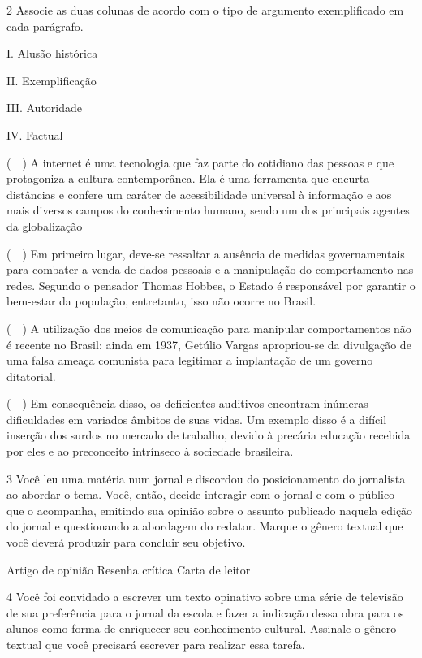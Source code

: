 \num{2} Associe as duas colunas de acordo com o tipo de argumento
exemplificado em cada parágrafo.

\begin{multicols}{2}
I. Alusão histórica 

II. Exemplificação

III. Autoridade

IV. Factual
\columnbreak

(~~) A internet é uma tecnologia que faz
parte do cotidiano das pessoas e que protagoniza a cultura
contemporânea. Ela é uma ferramenta que encurta distâncias e confere um
caráter de acessibilidade universal à informação e aos mais diversos
campos do conhecimento humano, sendo um dos principais agentes da
globalização 

(~~) Em primeiro lugar,
deve-se ressaltar a ausência de medidas governamentais para combater a
venda de dados pessoais e a manipulação do comportamento nas redes.
Segundo o pensador Thomas Hobbes, o Estado é responsável por garantir o
bem-estar da população, entretanto, isso não ocorre no Brasil.

(~~) A utilização dos meios de comunicação para
manipular comportamentos não é recente no Brasil: ainda em 1937, Getúlio
Vargas apropriou-se da divulgação de uma falsa ameaça comunista para
legitimar a implantação de um governo ditatorial. 

(~~) Em consequência disso, os deficientes auditivos
encontram inúmeras dificuldades em variados âmbitos de suas vidas. Um
exemplo disso é a difícil inserção dos surdos no mercado de trabalho,
devido à precária educação recebida por eles e ao preconceito intrínseco
à sociedade brasileira.
\end{multicols}

\num{3} Você leu uma matéria num jornal e discordou do posicionamento do
jornalista ao abordar o tema. Você, então, decide interagir com o jornal
e com o público que o acompanha, emitindo sua opinião sobre o assunto
publicado naquela edição do jornal e questionando a abordagem do
redator. Marque o gênero textual que você deverá produzir para concluir
seu objetivo.

\begin{boxlist}
 Artigo de opinião
 Resenha crítica
 Carta de leitor
\end{boxlist}

\num{4} Você foi convidado a escrever um texto opinativo sobre uma série
de televisão de sua preferência para o jornal da escola e fazer a
indicação dessa obra para os alunos como forma de enriquecer seu
conhecimento cultural. Assinale o gênero textual que você precisará
escrever para realizar essa tarefa.

